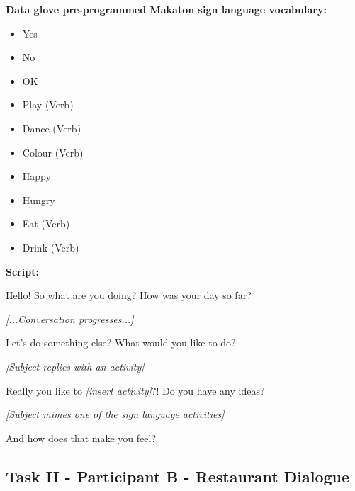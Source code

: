 \textbf{Data glove pre-programmed Makaton sign language vocabulary:}

\begin{itemize}
  \item Yes
  \item No
  \item OK
  \item Play (Verb)
  \item Dance (Verb)
  \item Colour (Verb)
  \item Happy
  \item Hungry
  \item Eat (Verb)
  \item Drink (Verb)
\end{itemize}

\textbf{Script:}

\begin{description}
  \item Hello! So what are you doing? How was your day so far?
  \item \textit{[...Conversation progresses...]}
  \item Let's do something else? What would you like to do?
  \item \textit{[Subject replies with an activity]}
  \item Really you like to \textit{[insert activity]}?! Do you have any ideas?
  \item \textit{[Subject mimes one of the sign language activities]}
  \item And how does that make you feel?
\end{description}

\subsection{Task II - Participant B - Restaurant Dialogue}

